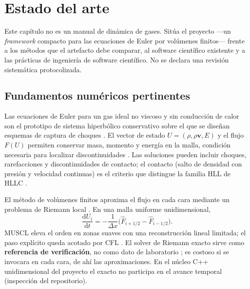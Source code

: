 
\chapter{Estado del arte}

Este capítulo no es un manual de dinámica de gases. Sitúa el proyecto ---un \textit{framework} compacto para las ecuaciones de Euler por volúmenes finitos--- frente a los métodos que el artefacto debe comparar, al software científico existente y a las prácticas de ingeniería de software científico. No se declara una revisión sistemática protocolizada.

\section{Fundamentos numéricos pertinentes}

Las ecuaciones de Euler para un gas ideal no viscoso y sin conducción de calor son el prototipo de sistema hiperbólico conservativo sobre el que se diseñan esquemas de captura de choques \parencite{toro2009,leveque2002,hirsch2007}. El vector de estado $U=(\rho,\rho\mathbf{v},E)$ y el flujo $F(U)$ permiten conservar masa, momento y energía en la malla, condición necesaria para localizar discontinuidades \parencite{toro2009}. Las soluciones pueden incluir choques, rarefacciones y discontinuidades de contacto; el contacto (salto de densidad con presión y velocidad continuas) es el criterio que distingue la familia HLL de HLLC \parencite{toro2009}.

El método de volúmenes finitos aproxima el flujo en cada cara mediante un problema de Riemann local \parencite{leveque2002}. En una malla uniforme unidimensional,
\begin{equation}
\frac{\mathrm{d}U_i}{\mathrm{d}t}=-\frac{1}{\Delta x}\bigl(\hat{F}_{i+1/2}-\hat{F}_{i-1/2}\bigr).
\end{equation}
MUSCL eleva el orden en zonas suaves con una reconstrucción lineal limitada; el paso explícito queda acotado por CFL \parencite{toro2009,hirsch2007}. El solver de Riemann exacto sirve como \textbf{referencia de verificación}, no como dato de laboratorio \parencite{toro2009,oberkampf2010}; es costoso si se invocara en cada cara, de ahí las aproximaciones. En el núcleo C++ unidimensional del proyecto el exacto no participa en el avance temporal (inspección del repositorio).

